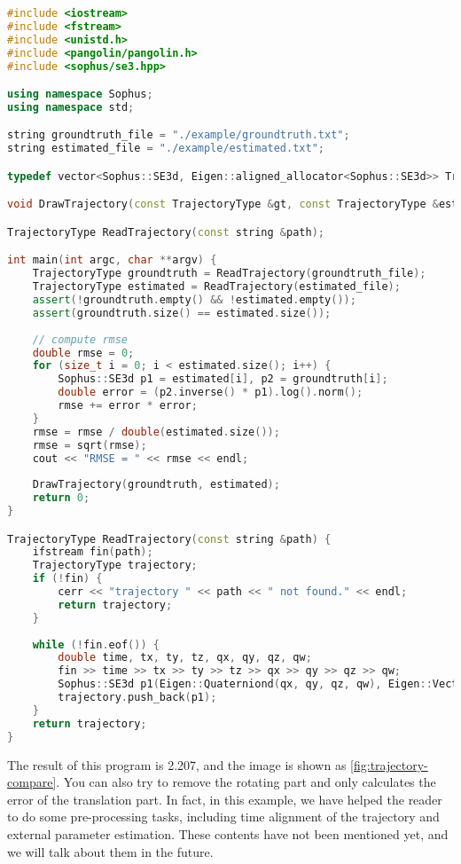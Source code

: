 \begin{lstlisting}[language=c++,caption=slambook/ch4/example/trajectoryError.cpp (part)]
#include <iostream>
#include <fstream>
#include <unistd.h>
#include <pangolin/pangolin.h>
#include <sophus/se3.hpp>

using namespace Sophus;
using namespace std;

string groundtruth_file = "./example/groundtruth.txt";
string estimated_file = "./example/estimated.txt";

typedef vector<Sophus::SE3d, Eigen::aligned_allocator<Sophus::SE3d>> TrajectoryType;

void DrawTrajectory(const TrajectoryType &gt, const TrajectoryType &esti);

TrajectoryType ReadTrajectory(const string &path);

int main(int argc, char **argv) {
    TrajectoryType groundtruth = ReadTrajectory(groundtruth_file);
    TrajectoryType estimated = ReadTrajectory(estimated_file);
    assert(!groundtruth.empty() && !estimated.empty());
    assert(groundtruth.size() == estimated.size());
    
    // compute rmse
    double rmse = 0;
    for (size_t i = 0; i < estimated.size(); i++) {
        Sophus::SE3d p1 = estimated[i], p2 = groundtruth[i];
        double error = (p2.inverse() * p1).log().norm();
        rmse += error * error;
    }
    rmse = rmse / double(estimated.size());
    rmse = sqrt(rmse);
    cout << "RMSE = " << rmse << endl;
    
    DrawTrajectory(groundtruth, estimated);
    return 0;
}

TrajectoryType ReadTrajectory(const string &path) {
    ifstream fin(path);
    TrajectoryType trajectory;
    if (!fin) {
        cerr << "trajectory " << path << " not found." << endl;
        return trajectory;
    }
    
    while (!fin.eof()) {
        double time, tx, ty, tz, qx, qy, qz, qw;
        fin >> time >> tx >> ty >> tz >> qx >> qy >> qz >> qw;
        Sophus::SE3d p1(Eigen::Quaterniond(qx, qy, qz, qw), Eigen::Vector3d(tx, ty, tz));
        trajectory.push_back(p1);
    }
    return trajectory;
}
\end{lstlisting}

The result of this program is 2.207, and the image is shown as \autoref{fig:trajectory-compare}. You can also try to remove the rotating part and only calculates the error of the translation part. In fact, in this example, we have helped the reader to do some pre-processing tasks, including time alignment of the trajectory and external parameter estimation. These contents have not been mentioned yet, and we will talk about them in the future.

